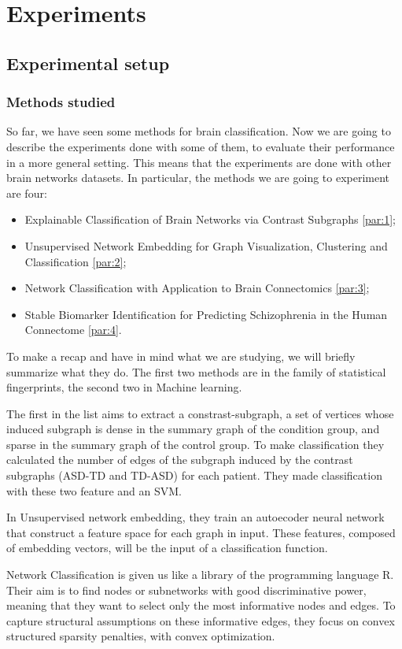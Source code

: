 \chapter{Experiments}
\label{chap:3}
\section{Experimental setup}
\subsection{Methods studied}
So far, we have seen some methods for brain classification. Now we are going to describe the experiments done with some of them, to evaluate their performance in a more general setting. This means that the experiments are done with other brain networks datasets. In particular, the methods we are going to experiment are four:
\begin{itemize}
	\item Explainable Classification of Brain Networks via Contrast Subgraphs \ref{par:1};
	\item Unsupervised Network Embedding for Graph Visualization, Clustering and Classification \ref{par:2};
	\item Network Classification with Application to Brain Connectomics \ref{par:3};
	\item Stable Biomarker Identification for Predicting Schizophrenia in the Human Connectome \ref{par:4}.
\end{itemize}
To make a recap and have in mind what we are studying, we will briefly summarize what they do. The first two methods are in the family of statistical fingerprints, the second two in Machine learning. 

The first in the list aims to extract a constrast-subgraph, a set of vertices whose induced subgraph is dense in the summary graph of the condition group, and sparse in the summary graph of the control group. To make classification they calculated the number of edges of the subgraph induced by the contrast subgraphs (ASD-TD and TD-ASD) for each patient. They made classification with these two feature and an SVM.

In Unsupervised network embedding, they train an autoecoder neural network that construct a feature space for each graph in input. These features, composed of embedding vectors, will be the input of a classification function. 

Network Classification is given us like a library of the programming language R. Their aim is to find nodes or subnetworks with good discriminative power, meaning that they want to select only the most informative nodes and edges. To capture structural assumptions on these informative edges, they focus on convex structured sparsity penalties, with convex optimization. 

